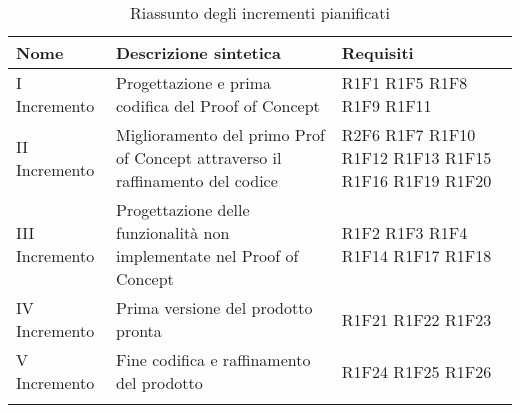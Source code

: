 \begin{center}
	\begin{longtable}{|p{2.5cm}|p{6.5cm}|p{6cm}|}
		\hline
		\rowcolor{lighter-grayer}
		\textbf{Nome}  & \textbf{Descrizione sintetica}                                                & \textbf{Requisiti} \\
		\hline
		\endfirsthead
		\hline
		\hline
		\endfoot
		\endlastfoot
		\hline
		I Incremento   & Progettazione e prima codifica del Proof of Concept                           & R1F1 R1F5 R1F8 R1F9 R1F11                 \\
		II Incremento  & Miglioramento del primo Prof of Concept attraverso il raffinamento del codice & R2F6 R1F7 R1F10 R1F12 R1F13 R1F15 R1F16 R1F19 R1F20                 \\
		III Incremento & Progettazione delle funzionalità non implementate nel Proof of Concept        & R1F2 R1F3 R1F4 R1F14 R1F17 R1F18                  \\
		IV Incremento  & Prima versione del prodotto pronta                                            & R1F21 R1F22 R1F23            \\
		V Incremento   & Fine codifica e raffinamento del prodotto                                     & R1F24 R1F25 R1F26                 \\ \hline
		\rowcolor{white}
		\caption{Riassunto degli incrementi pianificati}
	\end{longtable}
\end{center}